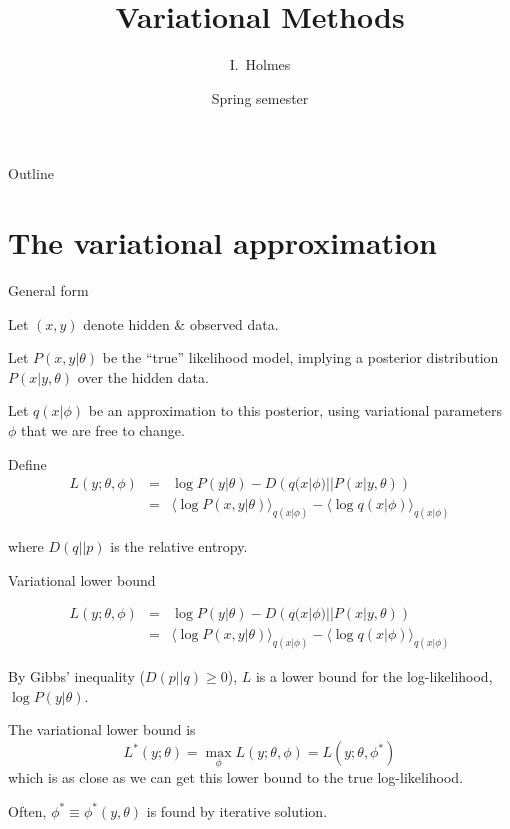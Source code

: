 \documentclass{beamer}
\title[Variational] %
{Variational Methods}
\author%
{I.~Holmes} %
\institute[University of California, Berkeley] %
{
  Department of Bioengineering\\
  University of California, Berkeley}
\date%
{Spring semester}
\begin{document}
\begin{frame}
  \titlepage
\end{frame}

\begin{frame}{Outline}
  \tableofcontents
\end{frame}

\section{The variational approximation}

\begin{frame}{General form}

Let $(x,y)$ denote hidden \& observed data.

Let $P(x,y|\theta)$ be the ``true'' likelihood model,
implying a posterior distribution $P(x|y,\theta)$ over the hidden data.

Let $q(x|\phi)$ be an approximation to this posterior,
using variational parameters $\phi$
that we are free to change.

Define
\begin{eqnarray*}
L(y;\theta,\phi) & = & \log P(y|\theta) - D\left(q(x|\phi)||P(x|y,\theta)\right) \\
& = & \langle \log P(x,y|\theta) \rangle_{q(x|\phi)} - \langle \log q(x|\phi) \rangle_{q(x|\phi)}
\end{eqnarray*}

where $D(q||p)$ is the relative entropy.

\end{frame}


\begin{frame}{Variational lower bound}

\begin{eqnarray*}
L(y;\theta,\phi) & = & \log P(y|\theta) - D\left(q(x|\phi)||P(x|y,\theta)\right) \\
& = & \langle \log P(x,y|\theta) \rangle_{q(x|\phi)} - \langle \log q(x|\phi) \rangle_{q(x|\phi)}
\end{eqnarray*}

By Gibbs' inequality ($D(p||q) \geq 0$), $L$ is a lower bound for the log-likelihood, $\log P(y|\theta)$.

The variational lower bound is
\[
L^\ast(y;\theta) = \max_{\phi} L(y;\theta,\phi) = L(y;\theta,\phi^\ast)
\]
which is as close as we can get this lower bound to the true log-likelihood.

Often, $\phi^\ast \equiv \phi^\ast(y,\theta)$ is found by iterative solution.

\end{frame}
\end{document}
